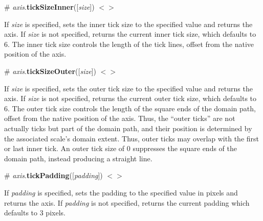 \label{_axis_tickSizeInner}%
\# {\itshape axis}.{\bfseries tick\+Size\+Inner}(\mbox{[}{\itshape size}\mbox{]}) \href{https://github.com/d3/d3-axis/blob/master/src/axis.js#L144}{\tt $<$$>$}

If {\itshape size} is specified, sets the inner tick size to the specified value and returns the axis. If {\itshape size} is not specified, returns the current inner tick size, which defaults to 6. The inner tick size controls the length of the tick lines, offset from the native position of the axis.

\label{_axis_tickSizeOuter}%
\# {\itshape axis}.{\bfseries tick\+Size\+Outer}(\mbox{[}{\itshape size}\mbox{]}) \href{https://github.com/d3/d3-axis/blob/master/src/axis.js#L148}{\tt $<$$>$}

If {\itshape size} is specified, sets the outer tick size to the specified value and returns the axis. If {\itshape size} is not specified, returns the current outer tick size, which defaults to 6. The outer tick size controls the length of the square ends of the domain path, offset from the native position of the axis. Thus, the “outer ticks” are not actually ticks but part of the domain path, and their position is determined by the associated scale’s domain extent. Thus, outer ticks may overlap with the first or last inner tick. An outer tick size of 0 suppresses the square ends of the domain path, instead producing a straight line.

\label{_axis_tickPadding}%
\# {\itshape axis}.{\bfseries tick\+Padding}(\mbox{[}{\itshape padding}\mbox{]}) \href{https://github.com/d3/d3-axis/blob/master/src/axis.js#L152}{\tt $<$$>$}

If {\itshape padding} is specified, sets the padding to the specified value in pixels and returns the axis. If {\itshape padding} is not specified, returns the current padding which defaults to 3 pixels. 